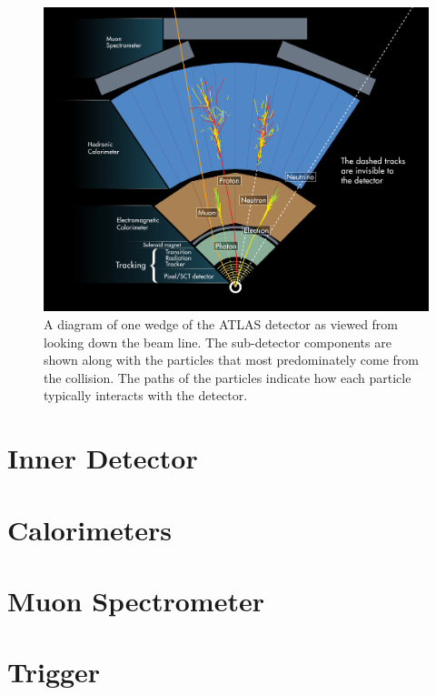 \begin{figure}[ht!]
\centering
\includegraphics[width=.9\textwidth]{figures/atlas/wedge.jpg}
\caption{A diagram of one wedge of the ATLAS detector
as viewed from looking down the beam line. 
The sub-detector components are shown along with the 
particles that most predominately come from the collision.
The paths of the particles indicate how each particle typically 
interacts with the detector.}
\label{fig:atlas_wedge}
\end{figure}




\section{Inner Detector}
\label{sec:atlas_id}
\section{Calorimeters }
\section{Muon Spectrometer}
\section{Trigger}

